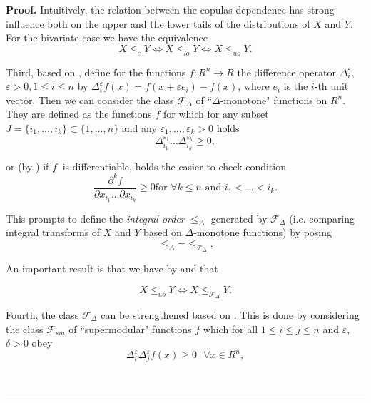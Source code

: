 \documentclass[onecolumn]{article}
\newenvironment{proof}[1][Proof]{\noindent\textbf{#1.} }{\ \rule{0.5em}{0.5em}}
\begin{document}
\begin{proof}
Intuitively, the relation between the copulas dependence has strong
influence both on the upper and the lower tails of the distributions of $X$
and $Y.$ For the bivariate case we have the equivalence 
\begin{equation}
X\leq _{c}Y\Longleftrightarrow X\leq _{lo}Y\Longleftrightarrow X\leq _{uo}Y.
\label{225.3}
\end{equation}

Third, based on \cite[Definition 6.6]{[5]}, define for the functions $%
f:R^{n}\longrightarrow R$ the difference operator $\Delta _{i}^{\varepsilon
} $, $\varepsilon >0,1\leq i\leq n$ by $\Delta _{i}^{\varepsilon
}f(x)=f(x+\varepsilon e_{i})-f(x)$, where $e_{i}$ is the $i$-th unit vector.
Then we can consider the class $\mathcal{F}_{\Delta }$ of \textquotedblleft $%
\Delta $-monotone" functions on $R^{n}$. They are defined as the functions $%
f $ for which for any subset $J=\{i_{1},...,i_{k}\}\subset \{1,...,n\}$ and
any $\varepsilon _{1},...,\varepsilon _{k}>0$ holds 
\begin{equation}
\Delta _{i_{1}}^{\varepsilon _{1}}...\Delta _{i_{k}}^{\varepsilon _{k}}\geq
0,  \label{225.4}
\end{equation}

or (by \cite[Remark 6.7]{[5]}) if $f$ $\ $is differentiable, holds the
easier to check condition 
\begin{equation}
\frac{\partial ^{k}f}{\partial x_{i_{1}}...\partial x_{i_{k}}}\geq 0\text{
for }\forall k\leq n\text{ and }i_{1}<...<i_{k}.  \label{225.6}
\end{equation}

This prompts to define the \textit{integral order} $\leq _{\Delta }$
generated by $\mathcal{F}_{\Delta }$ (i.e. comparing integral transforms of $%
X$ and $Y$ based on $\Delta $-monotone functions) by posing 
\begin{equation}
\leq _{\Delta }\text{=}\leq _{\mathcal{F}_{\Delta }}.  \label{225.7}
\end{equation}

An important result is that we have by \cite{[13]} and \cite[Theorem 6.8]%
{[5]} that

\begin{equation}
X\leq _{uo}Y\Longleftrightarrow X\leq _{\mathcal{F}_{\Delta }}Y.
\label{225.8}
\end{equation}

Fourth, the class $\mathcal{F}_{\Delta }$ can be strengthened based on \cite[%
Definition 6.12]{[5]}. This is done by considering the class $\mathcal{F}%
_{sm}$ of \textquotedblleft supermodular" functions $f$ which for all $1\leq
i\leq j\leq n$ and $\varepsilon $, $\delta >0$ obey 
\begin{equation}
\Delta _{i}^{\varepsilon }\Delta _{j}^{\varepsilon }f(x)\geq 0\text{ }%
\forall x\in R^{n},  \label{225.9}
\end{equation}


\end{proof}
\end{document}
